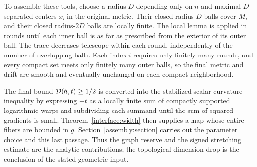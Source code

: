 To assemble these tools, choose a radius $D$ depending only on $n$
and maximal $D$-separated centers $x_i$ in the original metric.
Their closed radius-$D$ balls cover $M$, and their closed radius-$2D$
balls are locally finite. The local lemma is applied in rounds until
each inner ball is as far as prescribed from the exterior of its
outer ball. The trace decreases
telescope within each round, independently of the number of overlapping
balls. Each index $i$ requires only finitely many rounds, and every compact
set meets only finitely many outer balls, so the final metric and drift are
smooth and eventually unchanged on each compact neighborhood.

The final bound $\mathcal D(h,t)\ge1/2$ is converted into the stabilized
scalar-curvature inequality by expressing $-t$ as a locally finite sum
of compactly supported logarithmic warps and subdividing each summand
until the sum of squared gradients is small. Theorem~\ref{interface:width}
then supplies a map whose entire fibers are bounded in $g$.
Section~\ref{assembly:section} carries out the parameter choice and this
last passage. Thus the graph reserve and the signed stretching estimate
are the analytic contributions; the topological dimension drop is the
conclusion of the stated geometric input.
